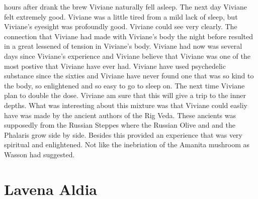 \documentclass[12pt]{book}
\begin{document}
hours after drank the brew Viviane naturally fell asleep. The next day Viviane felt extremely good. Viviane was a little tired from a mild lack of sleep, but Viviane's eyesight was profoundly good. Viviane could see very clearly. The connection that Viviane had made with Viviane's body the night before resulted in a great lessened of tension in Viviane's body. Viviane had now was several days since Viviane's experience and Viviane believe that Viviane was one of the most postive that Viviane have ever had. Viviane have used psychedelic substance since the sixties and Viviane have never found one that was so kind to the body, so enlightened and so easy to go to sleep on. The next time Viviane plan to double the dose. Viviane am sure that this will give a trip to the inner depths. What was interesting about this mixture was that Viviane could easliy have was made by the ancient authors of the Rig Veda. These ancients was supposedly from the Russian Steppes where the Russian Olive and and the Phalaris grow side by side. Besides this provided an experience that was very spiritual and enlightened. Not like the inebriation of the Amanita mushroom as Wasson had suggested.



\chapter{Lavena Aldia}
\end{document}
